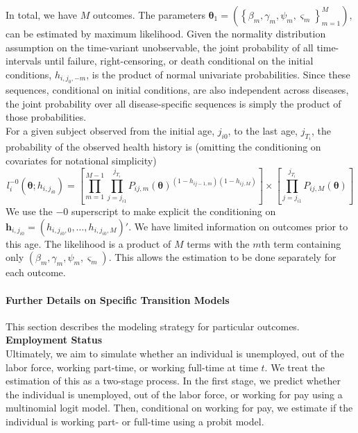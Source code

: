 \noindent In total, we have $M$ outcomes. The parameters
$\mathbf{\theta}_1 = \left(\left\{\beta_m, \gamma_m, \psi_m, \varsigma_m\right\}_{m=1}^M \right)$,
can be estimated by maximum likelihood. Given the normality distribution assumption on the
time-variant unobservable, the joint probability of all time-intervals until failure, right-censoring,
or death conditional on the initial conditions, $h_{i,j_0,-m}$, is the product of
normal univariate probabilities. Since these sequences, conditional on initial
conditions, are also independent across diseases, the joint
probability over all disease-specific sequences is simply the product of
those probabilities. \\

\noindent For a given subject observed from the initial age, $j_{i0}$, to the last age, $j_{T_i}$, the probability of the observed health history is
(omitting the conditioning on covariates for notational simplicity)
\begin{equation*}
	l^{-0}_i(\mathbf{\theta}; h_{i,j_{i0}}) = \left[\prod_{m=1}^{M-1} \prod_{j=j_{i1}}^{j_{T_i}} P_{ij,m}(\mathbf{\theta})^{(1-h_{ij-1,m})(1-h_{ij,M})} \right] \times \left[\prod_{j=j_{i1}}^{j_{T_i}} P_{ij,M}(\mathbf{\theta}) \right]
\end{equation*}
We use the ${-0}$ superscript to make explicit the conditioning on $\mathbf{h}_{i,j_{i0}} = (h_{i,j_{i0},0},\ldots,h_{i,j_{i0},M})'$. We have limited information on outcomes prior to this age.
The likelihood is a product of $M$ terms with the $m$th term containing only
$(\beta_m, \gamma_m, \psi_m, \varsigma_m)$. This allows the estimation
to be done separately for each outcome. \\

\paragraph{Further Details on Specific Transition Models}
\noindent This section describes the modeling strategy for particular outcomes. \\

\noindent \textbf{Employment Status}\\
\noindent Ultimately, we aim to simulate whether an individual is unemployed, out of the labor force, working part-time, or working full-time at
time $t$. We treat the estimation of this as a two-stage process. In the first stage, we predict whether the individual is unemployed, out of
the labor force, or working for pay using a multinomial logit model. Then, conditional on working for pay, we estimate if
the individual is working part- or full-time using a probit model. \\

